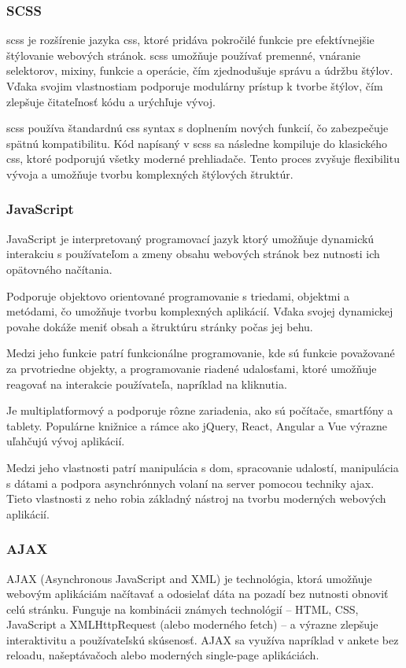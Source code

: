 \subsubsection{SCSS}
\acrfull{scss} je rozšírenie jazyka \acrshort{css}, ktoré pridáva pokročilé funkcie pre efektívnejšie štýlovanie webových stránok. 
\acrshort{scss} umožňuje používať premenné, vnáranie selektorov, mixiny, funkcie a operácie, čím zjednodušuje správu a údržbu štýlov.
 Vďaka svojim vlastnostiam podporuje modulárny prístup k tvorbe štýlov, čím zlepšuje čitateľnosť kódu a urýchľuje vývoj.

 \acrshort{scss} používa štandardnú \acrshort{css} syntax s doplnením nových funkcií, čo zabezpečuje spätnú kompatibilitu.
 Kód napísaný v \acrshort{scss} sa následne kompiluje do klasického \acrshort{css}, ktoré podporujú všetky moderné prehliadače. 
Tento proces zvyšuje flexibilitu vývoja a umožňuje tvorbu komplexných štýlových štruktúr.\cite{scss}
\subsubsection{JavaScript}
JavaScript \cite{JavaScript} je interpretovaný programovací jazyk ktorý umožňuje dynamickú interakciu s používateľom a zmeny obsahu webových stránok bez nutnosti ich opätovného načítania.

Podporuje objektovo orientované programovanie s triedami, objektmi a metódami, čo umožňuje tvorbu komplexných aplikácií. Vďaka svojej dynamickej povahe dokáže meniť obsah a štruktúru stránky počas jej behu.

Medzi jeho funkcie patrí funkcionálne programovanie, kde sú funkcie považované za prvotriedne objekty, a programovanie riadené udalosťami, ktoré umožňuje reagovať na interakcie používateľa, napríklad na kliknutia.

Je multiplatformový a podporuje rôzne zariadenia, ako sú počítače, smartfóny a tablety. Populárne knižnice a rámce ako jQuery, React, Angular a Vue výrazne uľahčujú vývoj aplikácií.

Medzi jeho vlastnosti patrí manipulácia s \acrfull{dom}, spracovanie udalostí, manipulácia s dátami a podpora asynchrónnych volaní na server pomocou techniky \acrfull{ajax}.
 Tieto vlastnosti z neho robia základný nástroj na tvorbu moderných webových aplikácií.
 \subsubsection{AJAX}
 AJAX (Asynchronous JavaScript and XML) je technológia, ktorá umožňuje webovým aplikáciám načítavať a odosielať dáta na pozadí bez nutnosti obnoviť celú stránku.
  Funguje na kombinácii známych technológií – HTML, CSS, JavaScript a XMLHttpRequest (alebo moderného fetch) – a výrazne zlepšuje interaktivitu a používateľskú skúsenosť. 
 AJAX sa využíva napríklad v ankete bez reloadu, našeptávačoch alebo moderných single-page aplikáciách.\cite{ajax}
